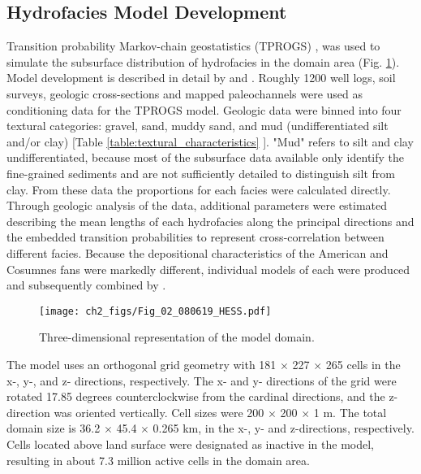 \subsection{Hydrofacies Model Development} \label{ssec:MM_tprogs_model}
Transition probability Markov-chain geostatistics (TPROGS) \citep{carle1996tprogs,carle1997modeling,carle1999t}, was used to simulate the subsurface distribution of hydrofacies in the domain area (Fig. \ref{fig:domain_3d}). Model development is described in detail by \cite{meirovitz2010thesis} and \cite{maples_2019}. Roughly 1200 well logs, soil surveys, geologic cross-sections and mapped paleochannels were used as conditioning data for the TPROGS model. Geologic data were binned into four textural categories: gravel, sand, muddy sand, and mud (undifferentiated silt and/or clay) [Table \ref{table:textural_characteristics} \citep{fleckenstein2004managing,meirovitz2010thesis}]. "Mud" refers to silt and clay undifferentiated, because most of the subsurface data available  only identify the fine-grained sediments and are not sufficiently detailed to distinguish silt from clay. From these data the proportions for each facies were calculated directly. Through geologic analysis of the data, additional parameters were estimated describing the mean lengths of each hydrofacies along the principal directions and the embedded transition probabilities to represent cross-correlation between different facies. Because the depositional characteristics of the American and Cosumnes fans were markedly different, individual models of each were produced and subsequently combined  by  \cite{meirovitz2010thesis}. 

\begin{figure}[t]
\centering
\texttt{[image: ch2\_figs/Fig\_02\_080619\_HESS.pdf]}
\caption{Three-dimensional representation of the model domain.}
\label{fig:domain_3d}
\end{figure}



The model uses an orthogonal grid geometry with 181 $\times$ 227 $\times$ 265 cells in the x-, y-, and z- directions, respectively. The x- and y- directions of the grid were rotated 17.85 degrees counterclockwise from the cardinal directions, and the z-direction was oriented vertically. Cell sizes were 200 $\times$ 200 $\times$ 1 m. The total domain size is 36.2 $\times$ 45.4 $\times$ 0.265 km, in the x-, y- and z-directions, respectively. Cells located above land surface were designated as inactive in the model, resulting in about 7.3 million active cells in the domain area. 

